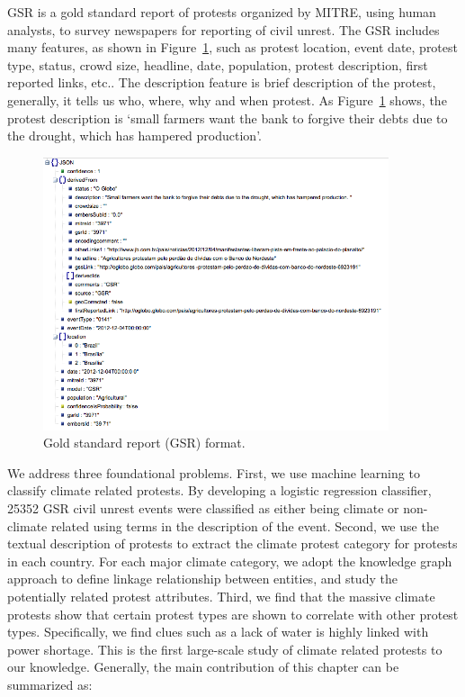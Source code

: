 GSR is a gold standard report of protests organized by MITRE, using human analysts, to survey newspapers for reporting of civil unrest. The GSR includes many features, as shown in Figure~\ref{GSR}, such as protest location, event date, protest type, status, crowd size, headline, date, population, protest description, first reported links, etc.. The description feature is brief description of the protest, generally, it tells us who, where, why and when protest. As Figure~\ref{GSR} shows, the protest description is `small farmers want the bank to forgive their debts due to the drought, which has hampered production'.

\begin{figure}[th]
\centerline
{\includegraphics[width = 4in]{figures/gsr_event_json.png}}
\caption{Gold standard report (GSR) format.}
\label{GSR}
\end{figure}


We address three foundational problems. First, we use machine learning to classify climate related protests. By developing a logistic regression classifier, 25352 GSR civil unrest events were classified as either being climate or non-climate related using terms in the description of the event. Second, we use the textual description of protests to extract the climate protest category for protests in each country. For each major climate category, we adopt the knowledge graph approach to define linkage relationship between entities, and study the potentially related protest attributes. Third, we find that the massive climate protests show that certain protest types are shown to correlate with other protest types. Specifically, we find clues such as a lack of water is highly linked with power shortage. This is the first large-scale study of climate related protests to our knowledge. Generally, the main contribution of this chapter can be summarized as:


